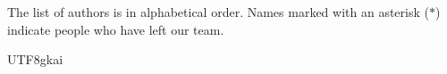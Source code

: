 \documentclass{article}
\begin{document}
The list of authors is in alphabetical order. Names marked with an asterisk ($\ast$) indicate people who have left our team.

\begin{CJK}{UTF8}{gkai}
\renewcommand{\arraystretch}{1.2}
\begin{tabular}{p{}p{}p{}p{}}

\end{tabular}
\end{CJK}
\end{document}
